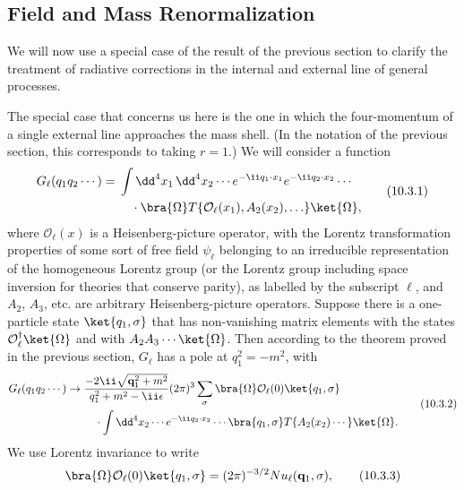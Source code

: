 \subsection{Field and Mass Renormalization}

We will now use a special case of the result of the previous section to
clarify the treatment of radiative corrections in the internal and external
line of general processes.

The special case that concerns us here is the one in which the four-momentum
of a single external line approaches the mass shell. (In the notation of the
previous section, this corresponds to taking $r=1$.) We will consider a
function
\begin{equation}
\begin{split}
G_\ell(q_1q_2\cdots)={}&\int \dd^4x_1\,\dd^4x_2\cdots
 e^{-\ii q_1\cdot x_1}e^{-\ii q_2\cdot x_2}\cdots \\
&\quad\cdot\bra{\Omega}T\{\mathcal O_\ell(x_1),A_2(x_2),\ldots\}\ket{\Omega},
\end{split}
\tag{10.3.1}\label{eq:10.3.1}
\end{equation}
where $\mathcal O_\ell(x)$ is a Heisenberg-picture operator, with the Lorentz
transformation properties of some sort of free field $\psi_\ell$ belonging to
an irreducible representation of the homogeneous Lorentz group (or the Lorentz
group including space inversion for theories that conserve parity), as labelled
by the subscript $\ell$, and $A_2$, $A_3$, etc. are arbitrary
Heisenberg-picture operators. Suppose there is a one-particle state
$\ket{q_1,\sigma}$ that has non-vanishing matrix elements with the states
$\mathcal O_\ell^\dagger\ket{\Omega}$ and with $A_2A_3\cdots\ket{\Omega}$.
Then according to the theorem proved in the previous section, $G_\ell$ has a
pole at $q_1^2=-m^2$, with
\begin{equation}
\begin{split}
G_\ell(q_1q_2\cdots)\to{}&
\frac{-2\ii\sqrt{\mathbf q_1^2+m^2}}{q_1^2+m^2-\ii\epsilon}
(2\pi)^3\sum_\sigma
\bra{\Omega}\mathcal O_\ell(0)\ket{q_1,\sigma}
\\
&\quad\cdot\int \dd^4x_2\cdots e^{-\ii q_2\cdot x_2}\cdots
\bra{q_1,\sigma}T\{A_2(x_2)\cdots\}\ket{\Omega}.
\end{split}
\tag{10.3.2}\label{eq:10.3.2}
\end{equation}
We use Lorentz invariance to write
\begin{equation}
\bra{\Omega}\mathcal O_\ell(0)\ket{q_1,\sigma}
=(2\pi)^{-3/2}N u_\ell(\mathbf q_1,\sigma),
\tag{10.3.3}\label{eq:10.3.3}
\end{equation}
